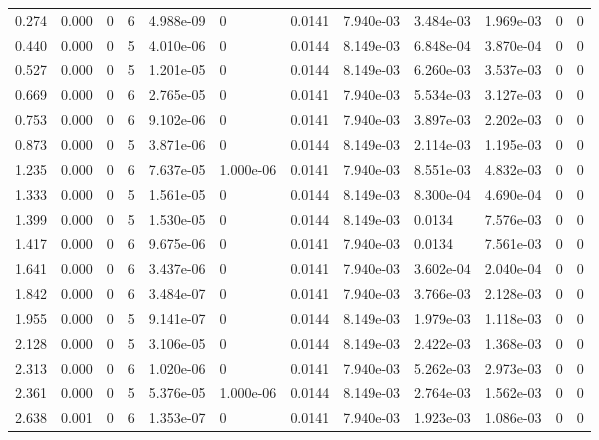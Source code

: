\documentclass[preview]{standalone}
\begin{document}
{{\begin{tabular}{L{1.2cm}C{1.2cm} C{0.3cm}C{0.5cm} C{1.4cm}C{1.4cm} C{1.4cm}C{1.4cm} C{1.6cm}C{1.6cm} C{1.6cm}C{1.6cm}}
  0.274  &  0.000  & 0     &  6 &  4.988e-09  & 0  &  0.0141&   7.940e-03& 3.484e-03 & 1.969e-03   &  0 & 0  \\ 
  0.440  &  0.000  & 0     &  5 &  4.010e-06  & 0  &  0.0144&   8.149e-03& 6.848e-04 & 3.870e-04   &  0 & 0  \\ 
  0.527  &  0.000  & 0     &  5 &  1.201e-05  & 0  &  0.0144&   8.149e-03& 6.260e-03 & 3.537e-03   &  0 & 0  \\ 
  0.669  &  0.000  & 0     &  6 &  2.765e-05  & 0  &  0.0141&   7.940e-03& 5.534e-03 & 3.127e-03   &  0 & 0  \\ 
  0.753  &  0.000  & 0     &  6 &  9.102e-06  & 0  &  0.0141&   7.940e-03& 3.897e-03 & 2.202e-03   &  0 & 0  \\ 
  0.873  &  0.000  & 0     &  5 &  3.871e-06  & 0  &  0.0144&   8.149e-03& 2.114e-03 & 1.195e-03   &  0 & 0  \\ 
  1.235  &  0.000  & 0     &  6 &  7.637e-05  & 1.000e-06  &  0.0141&   7.940e-03& 8.551e-03 & 4.832e-03   &  0 & 0  \\ 
  1.333  &  0.000  & 0     &  5 &  1.561e-05  & 0  &  0.0144&   8.149e-03& 8.300e-04 & 4.690e-04   &  0 & 0  \\ 
  1.399  &  0.000  & 0     &  5 &  1.530e-05  & 0  &  0.0144&   8.149e-03& 0.0134 & 7.576e-03   &  0 & 0  \\ 
  1.417  &  0.000  & 0     &  6 &  9.675e-06  & 0  &  0.0141&   7.940e-03& 0.0134 & 7.561e-03   &  0 & 0  \\ 
  1.641  &  0.000  & 0     &  6 &  3.437e-06  & 0  &  0.0141&   7.940e-03& 3.602e-04 & 2.040e-04   &  0 & 0  \\ 
  1.842  &  0.000  & 0     &  6 &  3.484e-07  & 0  &  0.0141&   7.940e-03& 3.766e-03 & 2.128e-03   &  0 & 0  \\ 
  1.955  &  0.000  & 0     &  5 &  9.141e-07  & 0  &  0.0144&   8.149e-03& 1.979e-03 & 1.118e-03   &  0 & 0  \\ 
  2.128  &  0.000  & 0     &  5 &  3.106e-05  & 0  &  0.0144&   8.149e-03& 2.422e-03 & 1.368e-03   &  0 & 0  \\ 
  2.313  &  0.000  & 0     &  6 &  1.020e-06  & 0  &  0.0141&   7.940e-03& 5.262e-03 & 2.973e-03   &  0 & 0  \\ 
  2.361  &  0.000  & 0     &  5 &  5.376e-05  & 1.000e-06  &  0.0144&   8.149e-03& 2.764e-03 & 1.562e-03   &  0 & 0  \\ 
  2.638  &  0.001  & 0     &  6 &  1.353e-07  & 0  &  0.0141&   7.940e-03& 1.923e-03 & 1.086e-03   &  0 & 0  \\ 

\end{tabular}}}
\end{document}
